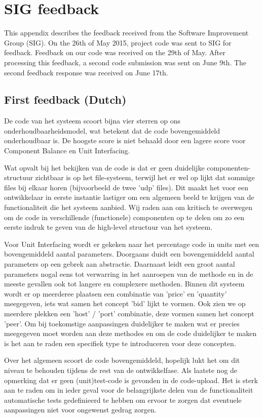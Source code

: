 \section{SIG feedback}
\label{SIG}
This appendix describes the feedback received from the Software Improvement Group (SIG).
On the 26th of May 2015, project code was sent to SIG for feedback.
Feedback on our code was received on the 29th of May.
After processing this feedback, a second code submission was sent on June 9th.
The second feedback response was received on June 17th.

\subsection{First feedback (Dutch)}

De code van het systeem scoort bijna vier sterren op ons onderhoudbaarheidsmodel, wat betekent dat de code bovengemiddeld onderhoudbaar is.
De hoogste score is niet behaald door een lagere score voor Component Balance en Unit Interfacing.


Wat opvalt bij het bekijken van de code is dat er geen duidelijke componenten-structuur zichtbaar is op het file-systeem, terwijl het er wel op lijkt dat sommige files bij elkaar horen (bijvoorbeeld de twee 'udp' files).
Dit maakt het voor een ontwikkelaar in eerste instantie lastiger om een algemeen beeld te krijgen van de functionaliteit die het systeem aanbied.
Wij raden aan om kritisch te overwegen om de code in verschillende (functionele) componenten op te delen om zo een eerste indruk te geven van de high-level structuur van het systeem.


Voor Unit Interfacing wordt er gekeken naar het percentage code in units met een bovengemiddeld aantal parameters.
Doorgaans duidt een bovengemiddeld aantal parameters op een gebrek aan abstractie.
Daarnaast leidt een groot aantal parameters nogal eens tot verwarring in het aanroepen van de methode en in de meeste gevallen ook tot langere en complexere methoden.
Binnen dit systeem wordt er op meerderee plaatsen een combinatie van 'price' en 'quantity' meegegeven, iets wat samen het concept 'bid' lijkt te vormen.
Ook zien we op meerdere plekken een 'host' / 'port' combinatie, deze vormen samen het concept 'peer'.
Om bij toekomstige aanpassingen duidelijker te maken wat er precies meegegeven moet worden aan deze methodes en om de code duidelijker te maken is het aan te raden een specifiek type te introduceren voor deze concepten.


Over het algemeen scoort de code bovengemiddeld, hopelijk lukt het om dit niveau te behouden tijdens de rest van de ontwikkelfase.
Als laatste nog de opmerking dat er geen (unit)test-code is gevonden in de code-upload.
Het is sterk aan te raden om in ieder geval voor de belangrijkste delen van de functionaliteit automatische tests gedefinieerd te hebben om ervoor te zorgen dat eventuele aanpassingen niet voor ongewenst gedrag zorgen.

